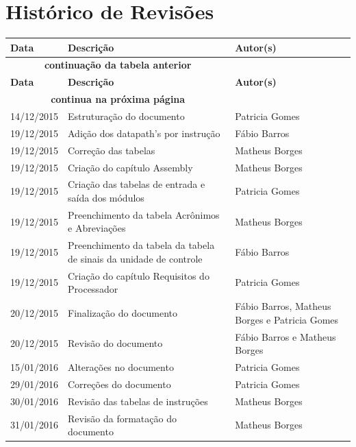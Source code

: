 \documentclass{report}
\begin{document}
\Organization{}

\capa
\newpage
\newpage

\section*{\center Histórico de Revisões}
\begin{center}
\begin{longtable}[pos]{|m{50pt} | m{200pt} | m{100pt}|} \hline
	\cellcolor[gray]{0.9} \textbf{Data} & \cellcolor[gray]{0.9}\textbf{Descrição} & \cellcolor[gray]{0.9}\textbf{Autor(s)}\\ \hline \endfirsthead \hline
	\multicolumn{2}{|c|}{{\bfseries \textbf{continuação da tabela anterior}}} \\ \hline
	\textbf{Data} & \cellcolor[gray]{0.9}\textbf{Descrição} & \cellcolor[gray]{0.9}\textbf{Autor(s)}\\ \hline
	\multicolumn{2}{|c|}{{\textbf{continua na próxima página}}} \\ \hline \endfoot
	\hline \endlastfoot
	
  14/12/2015 &  Estruturação do documento &  Patricia Gomes\\ \hline  
  19/12/2015 &  Adição dos datapath's por instrução &  Fábio Barros\\ \hline 
  19/12/2015 &  Correção das tabelas &  Matheus Borges\\ \hline 
  19/12/2015 &  Criação do capítulo Assembly & Matheus Borges\\ \hline 
  19/12/2015 &  Criação das tabelas de entrada e saída dos módulos &  Patricia Gomes\\ \hline 
  19/12/2015 &  Preenchimento da tabela Acrônimos e Abreviações &  Matheus Borges\\ \hline
  19/12/2015 &  Preenchimento da tabela da tabela de sinais da unidade de controle &  Fábio Barros\\ \hline 
  19/12/2015 &  Criação do capítulo Requisitos do Processador  & Patricia Gomes \\ \hline 
  20/12/2015 &  Finalização do documento & Fábio Barros, Matheus Borges e Patricia Gomes\\ \hline
  20/12/2015 &  Revisão do documento & Fábio Barros e Matheus Borges \\ \hline
  15/01/2016 &  Alterações no documento & Patricia Gomes \\ \hline 
  29/01/2016 &  Correções do documento & Patricia Gomes \\ \hline 
  30/01/2016 &  Revisão das tabelas de instruções & Matheus Borges \\ \hline 
  31/01/2016 &  Revisão da formatação do documento & Matheus Borges \\ \hline 
  

\end{longtable}
\end{center}
\newpage
\tableofcontents
\newpage
\end{document}
